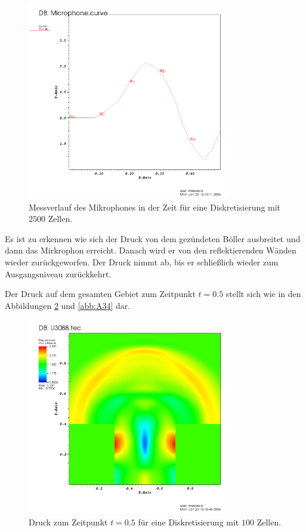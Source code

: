 \begin{figure}[H]
	\begin{center}
		\includegraphics[width=0.8\textwidth]{img/Microphone_highRes.png}
		\caption{Messverlauf des Mikrophones in der Zeit für eine Diskretisierung mit $2500$ Zellen.}
		\label{abb:A32}
	\end{center}
\end{figure}

Es ist zu erkennen wie sich der Druck von dem gezündeten Böller ausbreitet und
dann das Mirkrophon erreicht. Danach wird er von den reflektierenden Wänden
wieder zurückgeworfen. Der Druck nimmt ab, bis er schließlich wieder zum
Ausgangsniveau zurückkehrt.

Der Druck auf dem gesamten Gebiet zum Zeitpunkt $t=0.5$ stellt sich wie in den
Abbildungen \ref{abb:A33} und \ref{abb:A34} dar.

\begin{figure}[H]
	\begin{center}
		\includegraphics[width=0.8\textwidth]{img/Pressure_lowRes_scaled.png}
		\caption{Druck zum Zeitpunkt $t=0.5$ für eine Diskretisierung mit $100$ Zellen.}
		\label{abb:A33}
	\end{center}
\end{figure}

